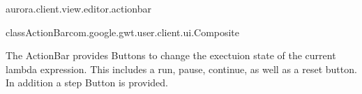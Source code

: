 \begin{texdocpackage}{aurora.client.view.editor.actionbar}
\label{texdoclet:aurora.client.view.editor.actionbar}

\begin{texdocclass}{class}{ActionBar}{com.google.gwt.user.client.ui.Composite}{}
\label{texdoclet:aurora.client.view.editor.actionbar.ActionBar}
\begin{texdocclassintro}
The ActionBar provides Buttons to change the exectuion state of the current lambda expression.
 This includes a run, pause, continue, as well as a reset button.
 In addition a step Button is provided.\end{texdocclassintro}
\begin{texdocclassconstructors}
\end{texdocclassconstructors}
\begin{texdocclassmethods}
\end{texdocclassmethods}
\end{texdocclass}


\end{texdocpackage}



